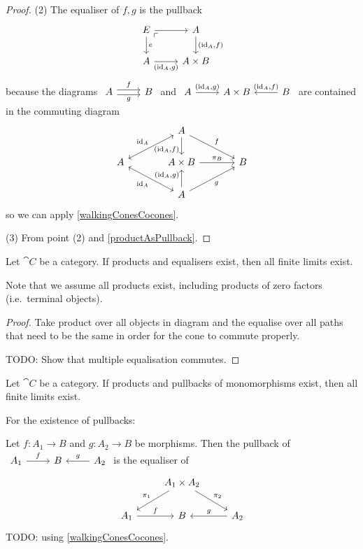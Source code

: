 \begin{proof}
(2) The equaliser of $f,g$ is the pullback
\[ \begin{tikzcd}
E \arrow[r] \arrow[d, "e"] \pbCorner & A \arrow[d, "{(\id_A, f)}"] \\
A \arrow[r, swap, "{(\id_A,g)}"] & A\times B
\end{tikzcd} \]
because the diagrams $\begin{tikzcd}
A \ar[r, shift left, "f"] \ar[r, shift right, swap, "g"] & B
\end{tikzcd}$ and $\begin{tikzcd}
A \ar[r, "{(\id_A,g)}"] & A\times B & \ar[l, swap, "{(\id_A, f)}"] B
\end{tikzcd}$ are contained in the commuting diagram
\[ \begin{tikzcd}[column sep=large]
& A \ar[dr, "{f}"] \ar[d, swap, pos=0.7, "{(\id_A, f)}"] & \\
A \ar[ur, leftrightarrow, "{\id_A}"] \ar[dr, leftrightarrow, swap, "{\id_A}"] & A\times B \ar[r, "{\proj_B}"] & B \\
& A \ar[ur, swap, "{g}"] \ar[u, pos=0.7, "{(\id_A, g)}"] &
\end{tikzcd} \]
so we can apply \ref{walkingConesCocones}.

(3) From point (2) and \ref{productAsPullback}.
\end{proof}

\begin{proposition}
Let $\cat{C}$ be a category. If products and equalisers exist, then all finite limits exist.
\end{proposition}
Note that we assume all products exist, including products of zero factors (i.e.\ terminal objects).
\begin{proof}
Take product over all objects in diagram and the equalise over all paths that need to be the same in order for the cone to commute properly.

TODO: Show that multiple equalisation commutes.
\end{proof}
\begin{corollary} \label{productsMonicPullbacksComplete}
Let $\cat{C}$ be a category. If products and pullbacks of monomorphisms exist, then all finite limits exist.
\end{corollary}

\begin{example}
For the existence of pullbacks:

Let $f: A_1 \to B$ and $g: A_2 \to B$ be morphisms. Then the pullback of $\begin{tikzcd}
A_1 \ar[r, "f"] & B & \ar[l, swap, "g"] A_2
\end{tikzcd}$ is the equaliser of
\[ \begin{tikzcd}
& A_1 \times A_2 \ar[dl, swap, "\proj_1"] \ar[dr, "\proj_2"] & \\
A_1 \ar[r, "f"] & B & \ar[l, swap, "g"] A_2
\end{tikzcd} \]
TODO: using \ref{walkingConesCocones}.

\end{example}

